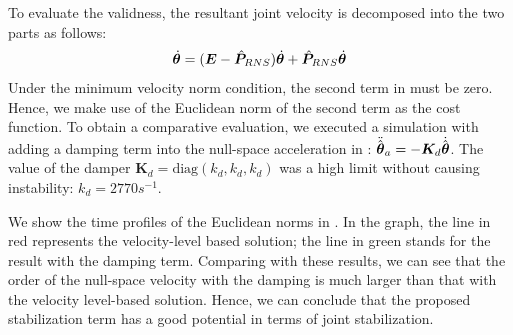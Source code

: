To evaluate the validness,
the resultant joint velocity is decomposed into the two parts as follows:
%
\begin{align}
  {\dot{\bm{\theta}}} = (\bm{E} - {\hat{\bm{P}}}_{RNS}){\dot{\bm{\theta}}} + {\hat{\bm{P}}}_{RNS}{\dot{\bm{\theta}}}\label{eq:DECOMPOSED}
\end{align}
%
Under the minimum velocity norm condition,
the second term in  must be zero.
Hence, we make use of the Euclidean norm of the second term as the cost function.
To obtain a comparative evaluation,
we executed a simulation with adding a damping term into the null-space acceleration in :
${\ddot{\hat{\bm{\theta}}}}_{a} = -\bm{K}_{d}{\dot{\hat{\bm{\theta}}}}$.
The value of the damper $\bm{K}_{d} = \mathrm{diag}(k_{d},k_{d},k_{d})$ was a high limit without
causing instability: $k_{d} = 2770 \unit{s^{-1}}$.


We show the time profiles of the Euclidean norms in .
In the graph,
the line in red represents the velocity-level based solution;
the line in green stands for the result with the damping term.
Comparing with these results,
we can see that the order of the null-space velocity with the damping is much larger than
that with the velocity level-based solution.
Hence, we can conclude that the proposed stabilization term has a good potential
in terms of joint stabilization.



